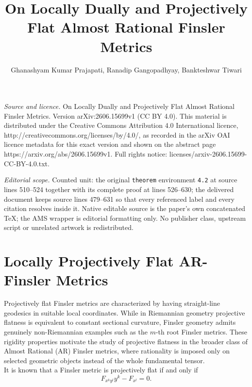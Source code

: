 \documentclass[10pt,a4paper]{amsart}
\begin{document}
\title[On Locally Dually and Projectively Flat Almost Rational Fins]{On Locally Dually and Projectively Flat Almost Rational Finsler Metrics}
\author{Ghanashyam Kumar Prajapati, Ranadip Gangopadhyay, Bankteshwar Tiwari}
\date{}
\maketitle
\noindent\emph{Source and licence.} On Locally Dually and Projectively Flat Almost Rational Finsler Metrics. Version arXiv:2606.15699v1 (CC BY 4.0). This material is distributed under the Creative Commons Attribution 4.0 International licence, http://creativecommons.org/licenses/by/4.0/, as recorded in the arXiv OAI licence metadata for this exact version and shown on the abstract page https://arxiv.org/abs/2606.15699v1. Full rights notice: licenses/arxiv-2606.15699-CC-BY-4.0.txt.\par\smallskip
\noindent\textit{Editorial scope.} Counted unit: the original \texttt{theorem} environment \texttt{4.2} at source lines 510--524 together with its complete proof at lines 526--630; the delivered document keeps source lines 479--631 so that every referenced label and every citation resolves inside it. Native editable source is the paper's own concatenated TeX; the AMS wrapper is editorial formatting only. No publisher class, upstream script or unrelated artwork is redistributed.
								\section{Locally Projectively Flat AR-Finsler Metrics} 
								
								Projectively flat Finsler metrics are characterized by having straight-line geodesics in suitable local coordinates. While in Riemannian geometry projective flatness is equivalent to constant sectional curvature, Finsler geometry admits genuinely non-Riemannian examples such as the $m$-th root Finsler metrics. These rigidity properties motivate the study of projective flatness in the broader class of Almost Rational (AR) Finsler metrics, where rationality is imposed only on selected geometric objects instead of the whole fundamental tensor.\\
								It is known \cite{hamel1903} that a Finsler metric is projectively flat if and only if
								\begin{equation}\label{2.3e}
								F_{x^k y^l} y^k - F_{x^l} = 0.
								\end{equation}
								
\end{document}
